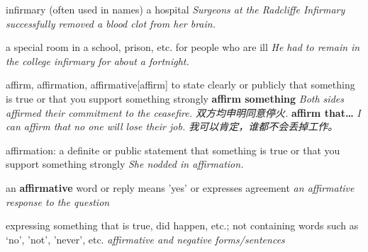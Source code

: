 \begin{DefWord}{infirmary}
    (often used in names) a hospital
    \textit{Surgeons at the Radcliffe Infirmary successfully removed a blood clot from her brain.}

    a special room in a school, prison, etc. for people who are ill
    \textit{He had to remain in the college infirmary for about a fortnight.}
\end{DefWord}

\begin{DefWord}{affirm, affirmation, affirmative}[affirm]
    to state clearly or publicly that something is true or that you support something strongly
    \textbf{affirm something} \textit{Both sides affirmed their commitment to the ceasefire. 双方均申明同意停火.}
    \textbf{affirm that…} \textit{I can affirm that no one will lose their job. 我可以肯定，谁都不会丢掉工作。}

    affirmation: a definite or public statement that something is true or that you support something strongly
    \textit{She nodded in affirmation.}

    an \textbf{affirmative} word or reply means 'yes' or expresses agreement
    \textit{an affirmative response to the question}

    expressing something that is true, did happen, etc.; not containing words such as `no', 'not', 'never', etc.
    \textit{affirmative and negative forms/sentences}
\end{DefWord}

